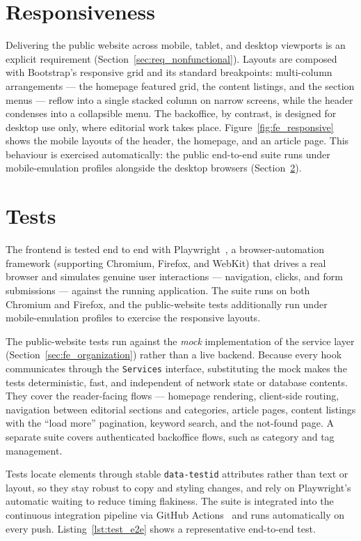 \section{Responsiveness} \label{sec:fe_responsive}

Delivering the public website across mobile, tablet, and desktop viewports is an explicit
requirement (Section~\ref{sec:req_nonfunctional}). Layouts are composed with Bootstrap's
responsive grid and its standard breakpoints: multi-column arrangements --- the homepage
featured grid, the content listings, and the section menus --- reflow into a single stacked
column on narrow screens, while the header condenses into a collapsible menu. The backoffice,
by contrast, is designed for desktop use only, where editorial work takes place.
Figure~\ref{fig:fe_responsive} shows the mobile layouts of the header, the homepage, and an
article page. This
behaviour is exercised automatically: the public end-to-end suite runs under mobile-emulation
profiles alongside the desktop browsers (Section~\ref{sec:fe_tests}).

\section{Tests} \label{sec:fe_tests}

The frontend is tested end to end with Playwright~\cite{playwright}, a browser-automation
framework (supporting Chromium, Firefox, and WebKit) that drives a real browser and
simulates genuine user interactions --- navigation, clicks, and form submissions ---
against the running application. The suite runs on both Chromium and Firefox, and the
public-website tests additionally run under mobile-emulation profiles to exercise the
responsive layouts.

The public-website tests run against the \emph{mock} implementation of the service layer
(Section~\ref{sec:fe_organization}) rather than a live backend. Because every hook
communicates through the \texttt{Services} interface, substituting the mock makes the
tests deterministic, fast, and independent of network state or database contents. They
cover the reader-facing flows --- homepage rendering, client-side routing, navigation
between editorial sections and categories, article pages, content listings with the
``load more'' pagination, keyword search, and the not-found page. A separate suite covers
authenticated backoffice flows, such as category and tag management.

Tests locate elements through stable \texttt{data-testid} attributes rather than text or
layout, so they stay robust to copy and styling changes, and rely on Playwright's
automatic waiting to reduce timing flakiness. The suite is integrated into the continuous
integration pipeline via GitHub Actions~\cite{github_actions} and runs automatically on
every push. Listing~\ref{lst:test_e2e} shows a representative end-to-end test.

